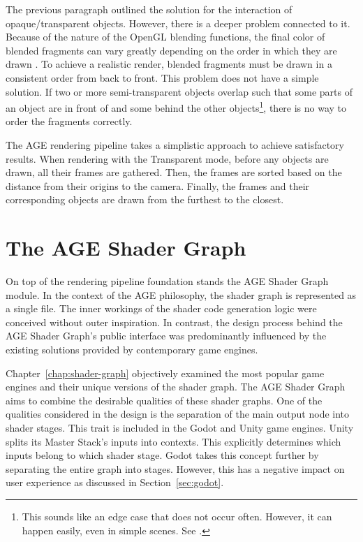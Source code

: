 \documentclass[
  digital,     %
  oneside,     %
  nosansbold,  %
  nocolorbold, %
  lof,         %
  lot,         %
]{fithesis4}
\begin{document}
The previous paragraph outlined the solution for the interaction of opaque/transparent
objects. However, there is a deeper problem connected to it.
Because of the nature of the OpenGL blending functions, the final color of blended
fragments can vary greatly depending on the order in which they are drawn \cite[p.263]{opengl-book}.
To achieve a realistic render, blended fragments must be drawn in a consistent
order from back to front. This problem does not have a simple solution.
If two or more semi-transparent objects overlap such that some parts of an object are
in front of and some behind the other objects\footnote{This sounds like an edge case that does not occur often.
However, it can happen easily, even in simple scenes. See \cite{alpha-sorting}.},
there is no way to order the fragments correctly.

The AGE rendering pipeline takes a simplistic approach to achieve satisfactory results.
When rendering with the Transparent mode, before any objects are drawn,
all their frames are gathered. Then, the frames are sorted based on the distance
from their origins to the camera. Finally, the frames and their corresponding objects are drawn
from the furthest to the closest.

\chapter{The AGE Shader Graph}
On top of the rendering pipeline foundation stands the AGE Shader Graph module.
In the context of the AGE philosophy, the shader graph is represented as a single file.
The inner workings of the shader code generation logic were conceived without outer inspiration.
In contrast, the design process behind the AGE Shader Graph's public interface was predominantly influenced
by the existing solutions provided by contemporary game engines.

Chapter~\ref{chap:shader-graph} objectively examined the most popular game engines and their unique versions of the shader graph.
The AGE Shader Graph aims to combine the desirable qualities of these shader graphs.
One of the qualities considered in the design is the separation of the main output node into shader stages.
This trait is included in the Godot and Unity game engines. Unity splits its Master Stack's inputs into contexts.
This explicitly determines which inputs belong to which shader stage.
Godot takes this concept further by separating the entire graph into stages. However, this
has a negative impact on user experience as discussed in Section~\ref{sec:godot}.
\end{document}
